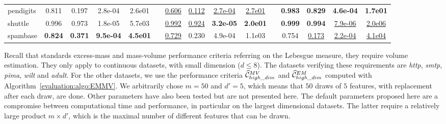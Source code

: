 \begin{table}[!ht]
{\begin{tabular}{l cccc c cccc c cccc}
pendigits    &0.811 &0.197 &2.8e-04&2.6e01 & &\underline{0.606} &\underline{0.112} &\underline{2.7e-04}&\underline{2.7e01}   & &\bf 0.983 &\bf 0.829 &\bf 4.6e-04&\bf 1.7e01 \\
shuttle      &0.996 &0.973 &1.8e-05&5.7e03 & &\underline{0.992} &\underline{0.924} &\bf 3.2e-05&\bf 2.0e01   & &\bf 0.999 &\bf 0.994 &\underline{7.9e-06}&\underline{2.0e06} \\
spambase     &\bf 0.824 &\bf 0.371 &\bf 9.5e-04&\bf 4.5e01&  &\underline{0.729} &0.230 &4.9e-04&1.1e03  &  &0.754 &\underline{0.173} &\underline{2.2e-04}&\underline{4.1e04} \\
\bottomrule
\end{tabular}
}
\end{table}

Recall that standards excess-mass and mass-volume performance criteria referring on the Lebesgue measure, they require volume estimation. They only apply to continuous datasets, with small dimension ($d \le 8$). The datasets verifying these requirements are \emph{http}, \emph{smtp}, %
\emph{pima}, \emph{wilt} and \emph{adult}.
For the other datasets, we use the performance criteria $\widehat{\mathcal{C}}^{MV}_{high\_dim}$ and $\widehat{\mathcal{C}}^{EM}_{high\_dim}$ computed with Algorithm~\ref{evaluation:algo:EMMV}. We arbitrarily chose $m = 50$ and $d'=5$, which means that $50$ draws of $5$ features, with replacement after each draw, are done.
Other parameters have also been tested but are not presented here. The default parameters proposed here are a compromise between computational time and performance, in particular on the largest dimensional datasets. The latter require a relatively large product $m \times d'$, which is the maximal number of different features that can be drawn.



